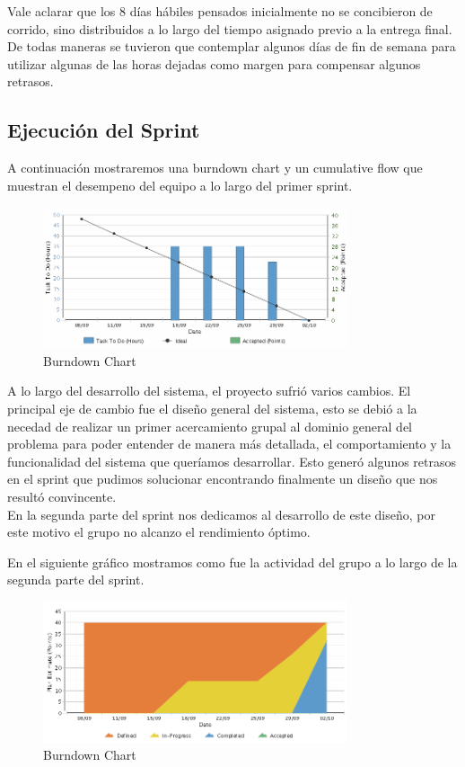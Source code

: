 \indent Vale aclarar que los 8 días hábiles pensados inicialmente no se concibieron de corrido, sino distribuidos a lo largo del tiempo asignado previo a la entrega final. De todas maneras se tuvieron que contemplar algunos días de fin de semana para utilizar algunas de las horas dejadas como margen para compensar algunos retrasos.

\subsection{Ejecución del Sprint}

A continuación mostraremos una burndown chart y un cumulative flow que muestran el desempeno del equipo a lo largo del primer sprint.

\begin{figure}[h!]
  \centering
  \includegraphics[width=0.8\textwidth]{./imagenes/burn_down.png}
  \caption{Burndown Chart}
  \label{fig:burn_down_chart}
\end{figure} 

A lo largo del desarrollo del sistema, el proyecto sufrió varios cambios. El principal eje de cambio fue el diseño general del sistema, esto se debió a la necedad de realizar un primer acercamiento grupal al dominio general del problema para poder entender de manera más detallada, el comportamiento y la funcionalidad del sistema que queríamos desarrollar. Esto generó algunos retrasos en el sprint que pudimos solucionar encontrando finalmente un diseño que nos resultó convincente. \\
En la segunda parte del sprint nos dedicamos al desarrollo de este diseño, por este motivo el grupo no alcanzo el rendimiento óptimo.

En el siguiente gráfico mostramos como fue la actividad del grupo a lo largo de la segunda parte del sprint.

\begin{figure}[h!]
  \centering
  \includegraphics[width=0.8\textwidth]{./imagenes/cumulative_flow.png}
  \caption{Burndown Chart}
  \label{fig:cumulative_flow}
\end{figure} 







